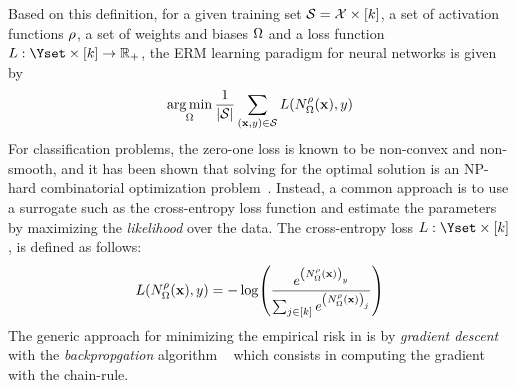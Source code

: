 \noindent
Based on this definition, for a given training set $\mathcal{S} = \mathcal{X} \times [k]$, a set of activation functions $\rho$, a set of weights and biases $\Omega$ and a loss function $L: \Yset \times [k] \rightarrow \Rbb_+$, the ERM learning paradigm for neural networks is given by
\begin{equation} \label{equation:ch2-erm_neural_network}
  \operatorname*{arg\,min}_{\Omega} \frac{1}{|\mathcal{S}|} \sum_{(\mathbf{x}, y) \in \mathcal{S}} L(N^\rho_\Omega(\mathbf{x}), y) 
\end{equation}
For classification problems, the zero-one loss is known to be non-convex and non-smooth, and it has been shown that solving for the optimal solution is an NP-hard combinatorial optimization problem~\cite{feldman2012agnostic,bendavid2003difficulty}.
Instead, a common approach is to use a surrogate such as the cross-entropy loss function and estimate the parameters by maximizing the \emph{likelihood} over the data.
The cross-entropy loss $L:\Yset \times [k]$, is defined as follows:
\begin{equation}
  L(N^\rho_\Omega(\xvec), y) = -\log
    \left(
      \frac
        {e^{\left(N^\rho_\Omega(\xvec)\right)_y}}
	{\sum_{j\in[k]} e^{\left(N^\rho_\Omega(\xvec)\right)_j}}
    \right)
\end{equation}
The generic approach for minimizing the empirical risk in  is by \emph{gradient descent} with the \emph{backpropgation} algorithm ~\cite{rumelhart1986learning} which consists in computing the gradient with the chain-rule.






